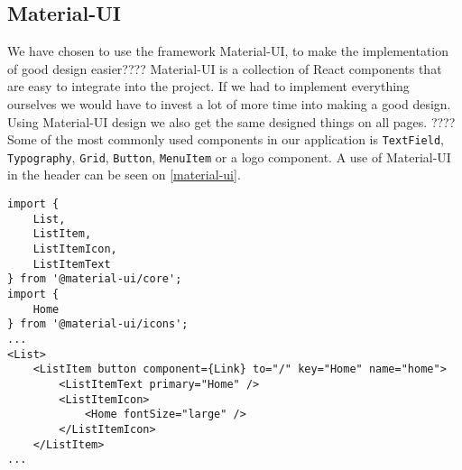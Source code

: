\subsection{Material-UI}
We have chosen to use the framework Material-UI, to make the implementation of good design easier????
Material-UI is a collection of React components that are easy to integrate into the project.
If we had to implement everything ourselves we would have to invest a lot of more time into making a good design.
Using Material-UI design we also get the same designed things on all pages. ????
Some of the most commonly used components in our application is \texttt{TextField}, \texttt{Typography}, \texttt{Grid}, \texttt{Button}, \texttt{MenuItem} or a logo component.
A use of Material-UI in the header can be seen on \autoref{material-ui}. 
\begin{lstlisting}[caption={Use of material-ui in the header}, captionpos=b, label={material-ui}]
import {
    List,
    ListItem,
    ListItemIcon,
    ListItemText
} from '@material-ui/core';
import {
	Home
} from '@material-ui/icons';
...
<List>
    <ListItem button component={Link} to="/" key="Home" name="home">
        <ListItemText primary="Home" />
        <ListItemIcon>
            <Home fontSize="large" />
        </ListItemIcon>
    </ListItem>
...
\end{lstlisting}

